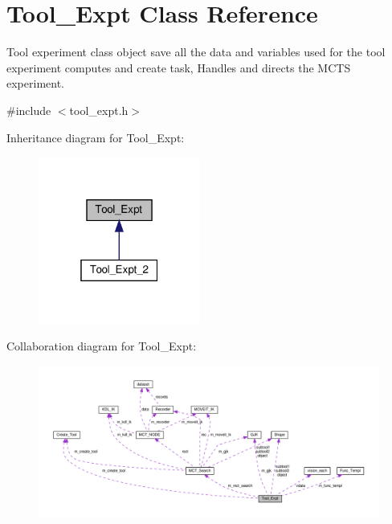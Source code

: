 \hypertarget{classTool__Expt}{}\section{Tool\+\_\+\+Expt Class Reference}
\label{classTool__Expt}


Tool experiment class object save all the data and variables used for the tool experiment computes and create task, Handles and directs the M\+C\+TS experiment.  




{\ttfamily \#include $<$tool\+\_\+expt.\+h$>$}



Inheritance diagram for Tool\+\_\+\+Expt\+:
\nopagebreak
\begin{figure}[H]
\begin{center}
\leavevmode
\includegraphics[width=151pt]{classTool__Expt__inherit__graph}
\end{center}
\end{figure}


Collaboration diagram for Tool\+\_\+\+Expt\+:
\nopagebreak
\begin{figure}[H]
\begin{center}
\leavevmode
\includegraphics[width=350pt]{classTool__Expt__coll__graph}
\end{center}
\end{figure}
